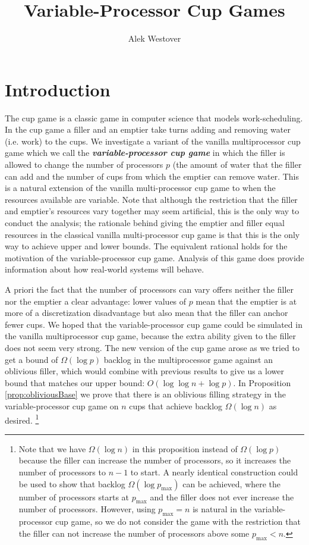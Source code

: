\documentclass[twocolumn]{article}[11pt]
\title{Variable-Processor Cup Games}
\author{Alek Westover}
\newcommand{\defn}[1]{{\textit{\textbf{\boldmath #1}}}}
\begin{document}
\maketitle

\section{Introduction}
The cup game is a classic game in computer science that models work-scheduling.
In the cup game a filler and an emptier take turns adding and removing water
(i.e. work) to the cups. We investigate a variant of the vanilla multiprocessor
cup game which we call the \defn{variable-processor cup game} in which the
filler is allowed to change the number of processors $p$ (the amount of water
that the filler can add and the number of cups from which the emptier can
remove water. This is a natural extension of the vanilla multi-processor cup
game to when the resources available are variable. Note that although the
restriction that the filler and emptier's resources vary together may seem
artificial, this is the only way to conduct the analysis; the rationale behind
giving the emptier and filler equal resources in the classical vanilla
multi-processor cup game is that this is the only way to achieve upper and
lower bounds. The equivalent rational holds for the motivation of the
variable-processor cup game. Analysis of this game does provide information
about how real-world systems will behave.

A priori the fact that the number of processors can vary offers neither the
filler nor the emptier a clear advantage: lower values of $p$ mean that the
emptier is at more of a discretization disadvantage but also mean that the
filler can anchor fewer cups.  We hoped that the variable-processor cup game
could be simulated in the vanilla multiprocessor cup game, because the extra
ability given to the filler does not seem very strong. The new version of the
cup game arose as we tried to get a bound of $\Omega(\log p)$ backlog in the
multiprocessor game against an oblivious filler, which would combine with
previous results to give us a lower bound that matches our upper bound:
$O(\log\log n + \log p)$. In Proposition \ref{prop:obliviousBase} we prove that
there is an oblivious filling strategy in the variable-processor cup game on
$n$ cups that achieve backlog $\Omega(\log n)$ as desired. \footnote{Note that
  we have $\Omega(\log n)$ in this proposition instead of $\Omega(\log p)$
  because the filler can increase the number of processors, so it increases the
  number of processors to $n-1$ to start. A nearly identical construction could
  be used to show that backlog $\Omega(\log p_{\max})$ can be achieved, where
  the number of processors starts at $p_{\max}$ and the filler does not ever
  increase the number of processors. However, using $p_{\max} = n$ is natural
  in the variable-processor cup game, so we do not consider the game with 
the restriction that the filler can not increase the number of processors above
some $p_{\max} < n$.}
\end{document}
